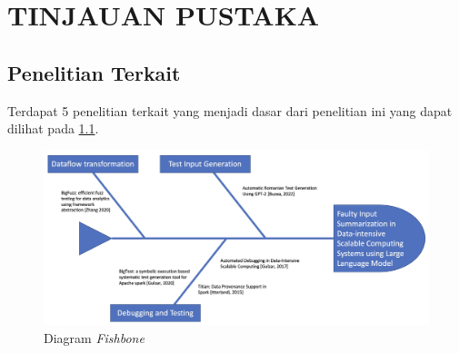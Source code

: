 \chapter{TINJAUAN PUSTAKA}
\label{chap:tinjauanpustaka}

\section{Penelitian Terkait}
\label{sec:penelitianterkait}

Terdapat 5 penelitian terkait yang menjadi dasar dari penelitian ini
yang dapat dilihat pada  \ref{fig:fishbone}.
\begin{figure}[H]
  \centering

  \includegraphics[scale=0.18]{gambar/StateOfTheArt.jpg}

  \caption{Diagram \emph{Fishbone}}
  \label{fig:fishbone}
\end{figure}

  


